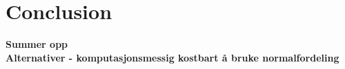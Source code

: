 
\section{Conclusion}
\textbf{Summer opp} \\
\textbf{Alternativer - komputasjonsmessig kostbart å bruke normalfordeling} \\
